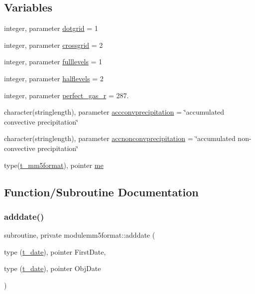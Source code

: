 \subsection*{Variables}
\begin{DoxyCompactItemize}
\item 
integer, parameter \mbox{\hyperlink{namespacemodulemm5format_a871b844ed6929a6562485e2a29d28989}{dotgrid}} = 1
\item 
integer, parameter \mbox{\hyperlink{namespacemodulemm5format_a8eb6f7aafd2e1d54d8df38612f563472}{crossgrid}} = 2
\item 
integer, parameter \mbox{\hyperlink{namespacemodulemm5format_a86c89b8f5d82abe380899e8a735d9a04}{fulllevels}} = 1
\item 
integer, parameter \mbox{\hyperlink{namespacemodulemm5format_acc9d4a4df78416271fbe07dc0b298995}{halflevels}} = 2
\item 
integer, parameter \mbox{\hyperlink{namespacemodulemm5format_af8de31546878abb803b899a68d6b863c}{perfect\+\_\+gas\+\_\+r}} = 287.
\item 
character(stringlength), parameter \mbox{\hyperlink{namespacemodulemm5format_a101bf0aa4a9ab5456ed7d19dc05bd796}{accconvprecipitation}} = \char`\"{}accumulated convective precipitation\char`\"{}
\item 
character(stringlength), parameter \mbox{\hyperlink{namespacemodulemm5format_ad160a358d9d8a90c1e91557493fd9482}{accnonconvprecipitation}} = \char`\"{}accumulated non-\/convective precipitation\char`\"{}
\item 
type(\mbox{\hyperlink{structmodulemm5format_1_1t__mm5format}{t\+\_\+mm5format}}), pointer \mbox{\hyperlink{namespacemodulemm5format_ae4f84fc3add37ecb0c20b09a854afc4f}{me}}
\end{DoxyCompactItemize}


\subsection{Function/\+Subroutine Documentation}
\mbox{\label{namespacemodulemm5format_a6db74d155aaf7a1fd0ac77423986f988}} 
\subsubsection{\texorpdfstring{adddate()}{adddate()}}
{\footnotesize\ttfamily subroutine, private modulemm5format\+::adddate (\begin{DoxyParamCaption}\item[{type (\mbox{\hyperlink{structmodulemm5format_1_1t__date}{t\+\_\+date}}), pointer}]{First\+Date,  }\item[{type (\mbox{\hyperlink{structmodulemm5format_1_1t__date}{t\+\_\+date}}), pointer}]{Obj\+Date }\end{DoxyParamCaption})\hspace{0.3cm}{\ttfamily [private]}}

